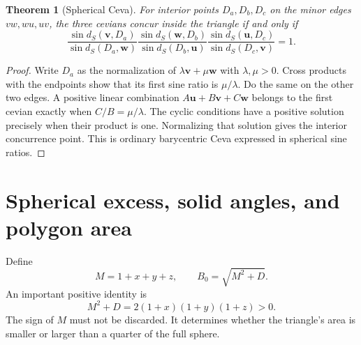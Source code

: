\documentclass[11pt,letterpaper]{article}
\numberwithin{equation}{section}
\newtheorem{theorem}{Theorem}[section]
\theoremstyle{definition}
\theoremstyle{remark}
\newcommand{\vv}[1]{\bm{#1}}
\begin{document}
\begin{theorem}[Spherical Ceva]\label{e3:thm:ceva}
For interior points $D_a,D_b,D_c$ on the minor edges $vw,wu,uv$, the three
cevians concur inside the triangle if and only if
\begin{equation}\label{e3:eq:sphericalceva}
 \frac{\sin d_S(\vv v,D_a)}{\sin d_S(D_a,\vv w)}
 \frac{\sin d_S(\vv w,D_b)}{\sin d_S(D_b,\vv u)}
 \frac{\sin d_S(\vv u,D_c)}{\sin d_S(D_c,\vv v)}=1.
\end{equation}
\end{theorem}
\begin{proof}
Write $D_a$ as the normalization of $\lambda\vv v+\mu\vv w$ with
$\lambda,\mu>0$. Cross products with the endpoints show that its first sine
ratio is $\mu/\lambda$. Do the same on the other two edges.
A positive linear combination $A\vv u+B\vv v+C\vv w$ belongs to the
first cevian exactly when $C/B=\mu/\lambda$. The cyclic conditions have a
positive solution precisely when their product is one. Normalizing that
solution gives the interior concurrence point. This is ordinary barycentric
Ceva expressed in spherical sine ratios.
\end{proof}

\section{Spherical excess, solid angles, and polygon area}\label{e3:sec:area}

Define
\begin{equation}\label{e3:eq:Mdef}
 M=1+x+y+z,\qquad B_0=\sqrt{M^2+D}.
\end{equation}
An important positive identity is
\begin{equation}\label{e3:eq:Midentity}
 M^2+D=2(1+x)(1+y)(1+z)>0.
\end{equation}
The sign of $M$ must not be discarded. It determines whether the triangle's
area is smaller or larger than a quarter of the full sphere.
\end{document}
